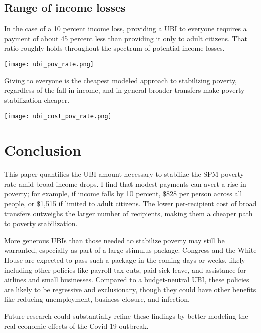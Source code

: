 \documentclass[12pt]{article}
\begin{document}
\subsection{Range of income losses} \label{sec:range_losses}

In the case of a 10 percent income loss, providing a UBI to everyone requires a payment of about 45 percent less than providing it only to adult citizens. That ratio roughly holds throughout the spectrum of potential income losses.

\begin{center}
\texttt{[image: ubi\_pov\_rate.png]}
\label{fig:poverty}
\end{center}

Giving to everyone is the cheapest modeled approach to stabilizing poverty, regardless of the fall in income, and in general broader transfers make poverty stabilization cheaper.

\begin{center}
\texttt{[image: ubi\_cost\_pov\_rate.png]}
\label{fig:poverty}
\end{center}

\section{Conclusion} \label{sec:conclusion}

This paper quantifies the UBI amount necessary to stabilize the SPM poverty rate amid broad income drops. I find that modest payments can avert a rise in poverty; for example, if income falls by 10 percent, \$828 per person across all people, or \$1,515 if limited to adult citizens. The lower per-recipient cost of broad transfers outweighs the larger number of recipients, making them a cheaper path to poverty stabilization.

More generous UBIs than those needed to stabilize poverty may still be warranted, especially as part of a large stimulus package. Congress and the White House are expected to pass such a package in the coming days or weeks, likely including other policies like payroll tax cuts, paid sick leave, and assistance for airlines and small businesses. Compared to a budget-neutral UBI, these policies are likely to be regressive and exclusionary, though they could have other benefits like reducing unemployment, business closure, and infection.

Future research could substantially refine these findings by better modeling the real economic effects of the Covid-19 outbreak.
\end{document}
